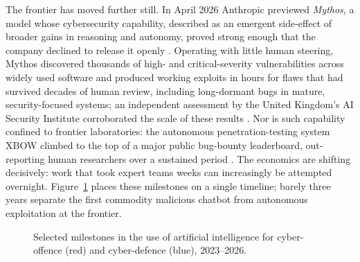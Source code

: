The frontier has moved further still. In April 2026 Anthropic previewed
\emph{Mythos}, a model whose cybersecurity capability, described as an emergent
side-effect of broader gains in reasoning and autonomy, proved strong enough that
the company declined to release it openly \cite{anthropic_mythos}. Operating with
little human steering, Mythos discovered thousands of high- and critical-severity
vulnerabilities across widely used software and produced working exploits in hours
for flaws that had survived decades of human review, including long-dormant bugs in
mature, security-focused systems; an independent assessment by the United Kingdom's
AI Security Institute corroborated the scale of these results
\cite{aisi_mythos}. Nor is such capability confined to frontier laboratories: the
autonomous penetration-testing system XBOW climbed to the top of a major public
bug-bounty leaderboard, out-reporting human researchers over a sustained period
\cite{xbow}. The economics are shifting decisively: work that took expert teams
weeks can increasingly be attempted overnight. Figure~\ref{fig:timeline} places
these milestones on a single timeline; barely three years separate the first
commodity malicious chatbot from autonomous exploitation at the frontier.

\begin{figure}[htbp]
\centering
{}
\caption[Timeline of the offensive-AI arms race]{Selected milestones in the use of artificial intelligence for cyber-offence (red) and cyber-defence (blue), 2023--2026.}
\label{fig:timeline}
\end{figure}

